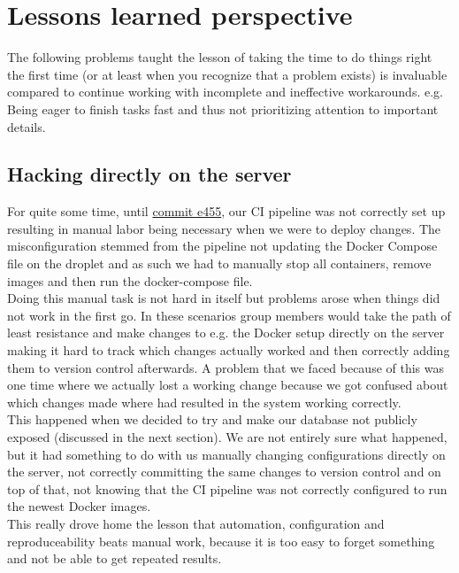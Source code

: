 \section{Lessons learned perspective}
The following problems taught the lesson of taking the time to do things right the first time (or at least when you recognize that a problem exists) is invaluable compared to continue working with incomplete and ineffective workarounds. e.g. Being eager to finish tasks fast and thus not prioritizing attention to important details.

\subsection{Hacking directly on the server}
For quite some time, until \href{https://github.com/Chillhound/DevOps2022F/commit/e45526bdfac81a342d1c74413dfd561e0bf05a89}{commit e455}, our CI pipeline was not correctly set up resulting in manual labor being necessary when we were to deploy changes. The misconfiguration stemmed from 
the pipeline not updating the Docker Compose file on the droplet and as such we had to manually stop all containers, remove images and then run the docker-compose file. \\
Doing this manual task is not hard in itself but problems arose when things did not work in the first go. In these scenarios group members would take the path of least resistance and make changes to e.g. the Docker setup directly on the server making it hard to track which changes actually worked and then correctly adding them to version control afterwards. A problem that we faced because of this was one time where we actually lost a working change because we got confused about which changes made where had resulted in the system working correctly. \\
This happened when we decided to try and make our database not publicly exposed (discussed in the next section). We are not entirely sure what happened, but it had something to do with us manually changing configurations directly on the server, not correctly committing the same changes to version control and on top of that, not knowing that the CI pipeline was not correctly configured to run the newest Docker images. \\
This really drove home the lesson that automation, configuration and reproduceability beats manual work, because it is too easy to forget something and not be able to get repeated results.

